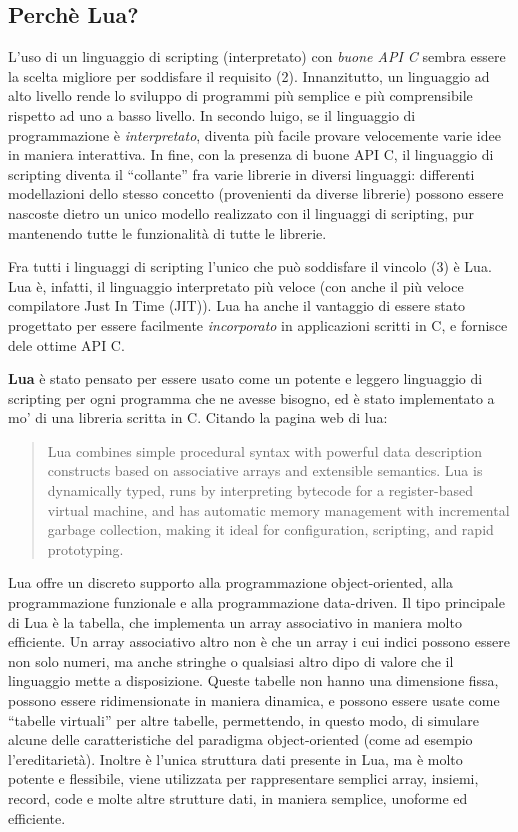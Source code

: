 \subsection{Perch\`e Lua?}
L'uso di un linguaggio di scripting (interpretato) con \emph{buone API C} sembra
essere la scelta migliore per soddisfare il requisito (2). Innanzitutto, un
linguaggio ad alto livello rende lo sviluppo di programmi pi\`u semplice e pi\`u
comprensibile rispetto ad uno a basso livello. In secondo luigo, se il linguaggio
di programmazione \`e \emph{interpretato}, diventa pi\`u facile provare velocemente
varie idee in maniera interattiva. In fine, con la presenza di buone API C, il
linguaggio di scripting diventa il ``collante'' fra varie librerie in diversi
linguaggi: differenti modellazioni dello stesso concetto (provenienti da diverse
librerie) possono essere nascoste dietro un unico modello realizzato con il
linguaggi di scripting, pur mantenendo tutte le funzionalit\`a di tutte le librerie.

Fra tutti i linguaggi di scripting l'unico che pu\`o soddisfare il vincolo (3)
\`e Lua. Lua \`e, infatti, il linguaggio interpretato pi\`u veloce (con anche il
pi\`u veloce compilatore Just In Time (JIT)). Lua ha anche il vantaggio di essere
stato progettato per essere facilmente \emph{incorporato} in applicazioni scritti
in C, e fornisce dele ottime API C.

\textbf{Lua} \`e stato pensato per essere usato come un potente e leggero
linguaggio di scripting per ogni programma che ne avesse bisogno, ed \`e stato
implementato a mo' di una libreria scritta in C. Citando la pagina web di lua:

\begin{quote}
Lua combines simple procedural syntax with powerful data description constructs
based on associative arrays and extensible semantics. Lua is dynamically typed,
runs by interpreting bytecode for a register-based virtual machine, and has
automatic memory management with incremental garbage collection, making it ideal
for configuration, scripting, and rapid prototyping.
\end{quote}

Lua offre un discreto supporto alla programmazione object-oriented, alla
programmazione funzionale e alla programmazione data-driven. Il tipo principale
di Lua \`e la tabella, che implementa un array associativo in maniera molto
efficiente. Un array associativo altro non \`e che un array i cui indici possono
essere non solo numeri, ma anche stringhe o qualsiasi altro dipo di valore che
il linguaggio mette a disposizione. Queste tabelle non hanno una dimensione fissa,
possono essere ridimensionate in maniera dinamica, e possono essere usate come
``tabelle virtuali'' per altre tabelle, permettendo, in questo modo, di simulare
alcune delle caratteristiche del paradigma object-oriented (come ad esempio
l'ereditariet\`a). Inoltre \`e l'unica struttura dati presente in Lua, ma \`e
molto potente e flessibile, viene utilizzata per rappresentare semplici array,
insiemi, record, code e molte altre strutture dati, in maniera semplice, unoforme
ed efficiente.


